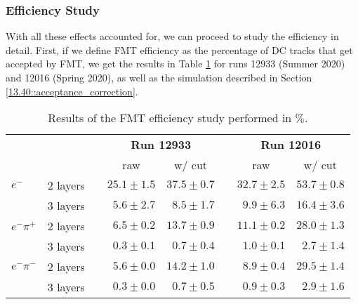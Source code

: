 \subsubsection{Efficiency Study}
\label{14.14::efficiency_study}
    With all these effects accounted for, we can proceed to study the efficiency in detail.
    First, if we define FMT efficiency as the percentage of DC tracks that get accepted by FMT, we get the results in Table \ref{tab::14.14::fmt_efficiency_study} for runs 12933 (Summer 2020) and 12016 (Spring 2020), as well as the simulation described in Section \ref{13.40::acceptance_correction}.

    \begin{table}[b]
        \begin{center}
            \begin{tabularx}{0.86\textwidth}{Xlcrrcrr}
                \toprule
                & & & \multicolumn{2}{c}{\textbf{Run 12933}} & & \multicolumn{2}{c}{\textbf{Run 12016}} \\
                                    &          & & \multicolumn{1}{c}{raw} & \multicolumn{1}{c}{w/ cut} & & \multicolumn{1}{c}{raw} & \multicolumn{1}{c}{w/ cut} \\
                \midrule \midrule
                \textbf{$e^-$}      & 2 layers & & $25.1 \pm 1.5$ & $37.5 \pm 0.7$ & & $32.7 \pm 2.5$ & $53.7 \pm 0.8$ \\
                                    & 3 layers & & $ 5.6 \pm 2.7$ & $ 8.5 \pm 1.7$ & & $ 9.9 \pm 6.3$ & $16.4 \pm 3.6$ \\
                \midrule
                \textbf{$e^-\pi^+$} & 2 layers & & $ 6.5 \pm 0.2$ & $13.7 \pm 0.9$ & & $11.1 \pm 0.2$ & $28.0 \pm 1.3$ \\
                                    & 3 layers & & $ 0.3 \pm 0.1$ & $ 0.7 \pm 0.4$ & & $ 1.0 \pm 0.1$ & $ 2.7 \pm 1.4$ \\
                \midrule
                \textbf{$e^-\pi^-$} & 2 layers & & $ 5.6 \pm 0.0$ & $14.2 \pm 1.0$ & & $ 8.9 \pm 0.4$ & $29.5 \pm 1.4$ \\
                                    & 3 layers & & $ 0.3 \pm 0.0$ & $ 0.7 \pm 0.5$ & & $ 0.9 \pm 0.3$ & $ 2.9 \pm 1.6$ \\
                \bottomrule
            \end{tabularx}
        \end{center}
        \caption[FMT efficiency study results]
        {Results of the FMT efficiency study performed in $\%$.}
        \label{tab::14.14::fmt_efficiency_study}
    \end{table}

